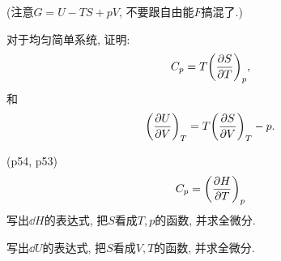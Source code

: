 \begin{questions}
\begin{solution}
(注意$G=U-TS+pV$, 不要跟自由能$F$搞混了.)
  \end{solution}
  \question 对于均匀简单系统, 证明:
  \begin{equation}
    C_p = T\qty(\pdv{S}{T})_p,
  \end{equation}
  和
  \begin{equation}
    \qty(\pdv{U}{V})_T = T\qty(\pdv{S}{V})_T - p.
  \end{equation}
  \begin{solution}
(p54, p53)
\begin{equation}
  C_p = \qty(\pdv{H}{T})_p
\end{equation}
写出$\dd H$的表达式, 把$S$看成$T,p$的函数, 并求全微分.

写出$\dd U$的表达式, 把$S$看成$V,T$的函数, 并求全微分.
  \end{solution}
\end{questions}

